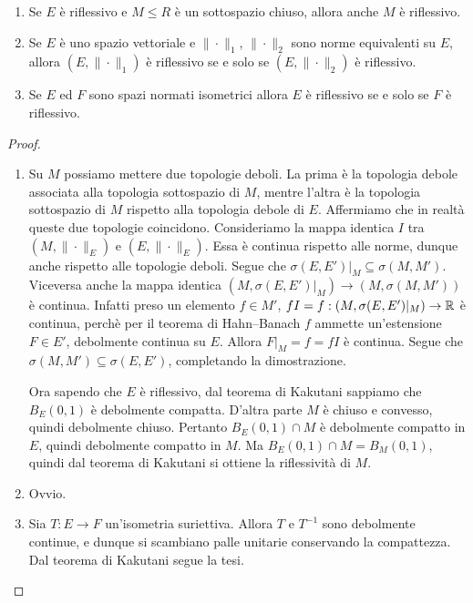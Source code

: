 \begin{lemma}
	\leavevmode
	\begin{enumerate}
		\item Se $E$ è riflessivo e $M \leq R$ è un sottospazio chiuso, allora anche $M$ è riflessivo.
		\item Se $E$ è uno spazio vettoriale e $\|\cdot\|_1$, $\|\cdot\|_2$ sono norme equivalenti su $E$, allora $(E, \|\cdot\|_1)$ è riflessivo se e solo se $(E, \|\cdot\|_2)$ è riflessivo.
		\item Se $E$ ed $F$ sono spazi normati isometrici allora $E$ è riflessivo se e solo se $F$ è riflessivo.
	\end{enumerate}
\end{lemma}
\begin{proof}
	\leavevmode
	\begin{enumerate}
		\item Su $M$ possiamo mettere due topologie deboli. La prima è la topologia debole associata alla topologia sottospazio di $M$, mentre l'altra è la topologia sottospazio di $M$ rispetto alla topologia debole di $E$. Affermiamo che in realtà queste due topologie coincidono. Consideriamo la mappa identica $I$ tra $(M, \|\cdot\|_E)$ e $(E, \|\cdot\|_E)$. Essa è continua rispetto alle norme, dunque anche rispetto alle topologie deboli. Segue che $\sigma(E,E')\vert_M \subseteq \sigma(M,M')$. Viceversa anche la mappa identica $(M, \sigma(E,E')\vert_M) \to (M, \sigma(M,M'))$ è continua. Infatti preso un elemento $f \in M'$, $fI = f : (M, \sigma(E,E')\vert_M) \to \mathbb{R}$ è continua, perchè per il teorema di Hahn--Banach $f$ ammette un'estensione $F \in E'$, debolmente continua su $E$. Allora $F\vert_M = f = fI$ è continua. Segue che $\sigma(M,M') \subseteq \sigma(E,E')$, completando la dimostrazione.

		Ora sapendo che $E$ è riflessivo, dal teorema di Kakutani sappiamo che $B_E(0,1)$ è debolmente compatta. D'altra parte $M$ è chiuso e convesso, quindi debolmente chiuso. Pertanto $B_E(0,1) \cap M$ è debolmente compatto in $E$, quindi debolmente compatto in $M$. Ma $B_E(0, 1) \cap M = B_M(0,1)$, quindi dal teorema di Kakutani si ottiene la riflessività di $M$.

		\item Ovvio.

		\item Sia $T:E \to F$ un'isometria suriettiva. Allora $T$ e $T^{-1}$ sono debolmente continue, e dunque si scambiano palle unitarie conservando la compattezza. Dal teorema di Kakutani segue la tesi.
	\end{enumerate}
\end{proof}

